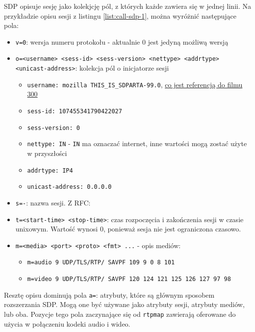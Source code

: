 \cite{rfc8866} SDP opisuje sesję jako kolekjcję pól, z których każde zawiera się w jednej linii. Na przykładzie opisu
sesji z listingu \ref{list:call-sdp-1}, można wyróżnić następujące pola:

\begin{itemize}
    \item \verb|v=0|: wersja numeru protokołu - aktualnie 0 jest jedyną możliwą wersją
    \item \verb|o=<username> <sess-id> <sess-version> <nettype> <addrtype> <unicast-address>|: kolekcja pól o inicjatorze
          sesji
          \begin{itemize}
              \item \verb|username: mozilla THIS_IS_SDPARTA-99.0|, \href{https://stackoverflow.com/a/52583935}{co jest referencją do filmu 300}
              \item \verb|sess-id: 107455341790422027|
              \item \verb|sess-version: 0|
              \item \verb|nettype: IN| - \verb|IN| ma oznaczać internet, inne wartości mogą zostać użyte w przyszłości
              \item \verb|addrtype: IP4|
              \item \verb|unicast-address: 0.0.0.0|
          \end{itemize}
    \item \verb|s=-|: nazwa sesji. Z RFC: \cite{rfc8866}
    \item \verb|t=<start-time> <stop-time>|: czas rozpoczęcia i zakończenia sesji w czasie unixowym. Wartość wynosi 0,
          ponieważ sesja nie jest ograniczona czasowo.
    \item \verb|m=<media> <port> <proto> <fmt> ...| - opis mediów:
          \begin{itemize}
              \item \verb|m=audio 9 UDP/TLS/RTP/ SAVPF 109 9 0 8 101|
              \item \verb|m=video 9 UDP/TLS/RTP/ SAVPF 120 124 121 125 126 127 97 98|
          \end{itemize}
\end{itemize}

Resztę opisu dominują pola \verb|a=|: atrybuty, które są głównym sposobem rozszerzania SDP. Mogą one
być używane jako atrybuty sesji, atrybuty mediów, lub oba. Pozycje tego pola zaczynające się od
\verb|rtpmap| zawierają oferowane do użycia w połączeniu kodeki audio i wideo.
